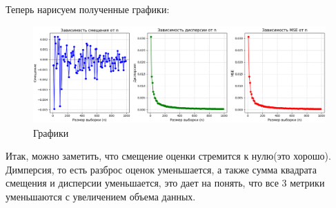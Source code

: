 \documentclass[14pt]{extreport}
\begin{document}
Теперь нарисуем полученные графики:


\begin{figure}[h]
    \centering
    \includegraphics[width=1\textwidth]{image1.png}
    \caption{Графики}
\end{figure}

Итак, можно заметить, что смещение оценки стремится к нулю(это хорошо).
Димперсия, то есть разброс оценок уменьшается, а также сумма квадрата
смещения и дисперсии уменьшается, это дает на понять, что все 3 метрики уменьшаются
с увеличением объема данных.
\end{document}
